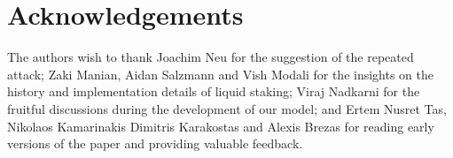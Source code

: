 \section{Acknowledgements}

The authors wish to thank Joachim Neu for the suggestion of the repeated attack;
Zaki Manian, Aidan Salzmann and Vish Modali for the insights on the history and
implementation details of liquid staking;
Viraj Nadkarni for the fruitful discussions during the
development of our model; and Ertem Nusret Tas, Nikolaos Kamarinakis
Dimitris Karakostas and Alexis Brezas for reading early versions of the paper
and providing valuable feedback.